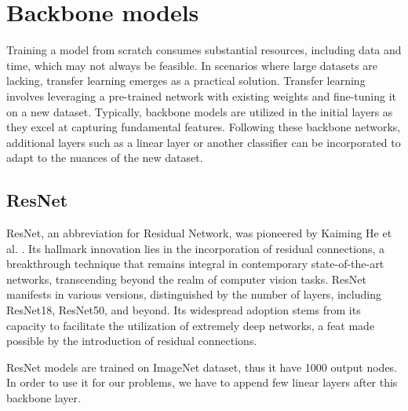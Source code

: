 \section{Backbone models}
    Training a model from scratch consumes substantial resources, including data and time, which may not always be feasible. In scenarios where large datasets are lacking, transfer learning emerges as a practical solution. Transfer learning involves leveraging a pre-trained network with existing weights and fine-tuning it on a new dataset. Typically, backbone models are utilized in the initial layers as they excel at capturing fundamental features. Following these backbone networks, additional layers such as a linear layer or another classifier can be incorporated to adapt to the nuances of the new dataset.

    \subsection{ResNet}
    ResNet, an abbreviation for Residual Network, was pioneered by Kaiming He et al. \cite{he2016deep}. Its hallmark innovation lies in the incorporation of residual connections, a breakthrough technique that remains integral in contemporary state-of-the-art networks, transcending beyond the realm of computer vision tasks. ResNet manifests in various versions, distinguished by the number of layers, including ResNet18, ResNet50, and beyond. Its widespread adoption stems from its capacity to facilitate the utilization of extremely deep networks, a feat made possible by the introduction of residual connections.

    ResNet models are trained on ImageNet dataset, thus it have 1000 output nodes. In order to use it for our problems, we have to append few linear layers after this backbone layer.